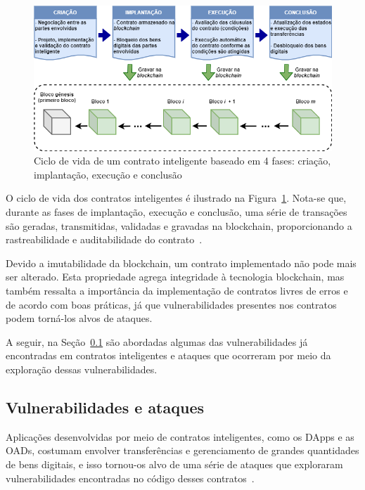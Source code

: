 \begin{figure}[htb]
 \caption{Ciclo de vida de um contrato inteligente baseado em 4 fases: criação, implantação, execução e conclusão}
 \label{fig:contrato-ciclo-de-vida}
 \centering
 \includegraphics[scale=0.6]{figuras/contrato_ciclo_de_vida.png}
\end{figure}

O ciclo de vida dos contratos inteligentes é ilustrado na Figura~\ref{fig:contrato-ciclo-de-vida}. Nota-se que, durante as fases de implantação, execução e conclusão, uma série de transações são geradas, transmitidas, validadas e gravadas na blockchain, proporcionando a rastreabilidade e auditabilidade do contrato~\cite{overview-smartcontracts2020zheng}.

Devido a imutabilidade da blockchain, um contrato implementado não pode mais ser alterado. Esta propriedade agrega integridade à tecnologia blockchain, mas também ressalta a importância da implementação de contratos livres de erros e de acordo com boas práticas, já que vulnerabilidades presentes nos contratos podem torná-los alvos de ataques.

A seguir, na Seção~\ref{tex:fund:ethereum:vuln-ataques} são abordadas algumas das vulnerabilidades já encontradas em contratos inteligentes e ataques que ocorreram por meio da exploração dessas vulnerabilidades.  

\subsection{Vulnerabilidades e ataques} \label{tex:fund:ethereum:vuln-ataques}

Aplicações desenvolvidas por meio de contratos inteligentes, como os DApps e as OADs, costumam envolver transferências e gerenciamento de grandes quantidades de bens digitais, e isso tornou-os alvo de uma série de ataques que exploraram vulnerabilidades encontradas no código desses contratos~\cite{atzei2017survey-attacks-sok, liu2019survey-ieeeaccess, chen2020survey-ethereum-acm}.

